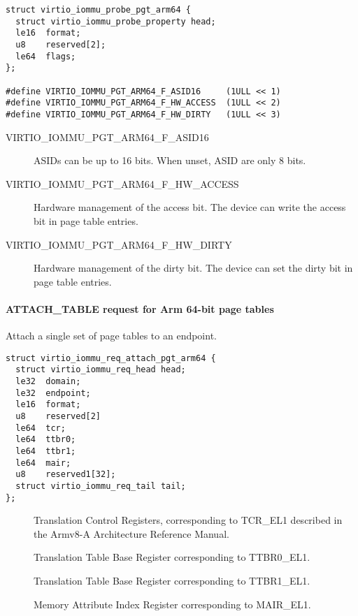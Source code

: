 \begin{lstlisting}
struct virtio_iommu_probe_pgt_arm64 {
  struct virtio_iommu_probe_property head;
  le16  format;
  u8    reserved[2];
  le64  flags;
};

#define VIRTIO_IOMMU_PGT_ARM64_F_ASID16     (1ULL << 1)
#define VIRTIO_IOMMU_PGT_ARM64_F_HW_ACCESS  (1ULL << 2)
#define VIRTIO_IOMMU_PGT_ARM64_F_HW_DIRTY   (1ULL << 3)
\end{lstlisting}

\begin{description}
  \item[VIRTIO_IOMMU_PGT_ARM64_F_ASID16] ASIDs can be up to 16
    bits. When unset, ASID are only 8 bits.
  \item[VIRTIO_IOMMU_PGT_ARM64_F_HW_ACCESS] Hardware management
    of the access bit. The device can write the access bit in page
    table entries.
  \item[VIRTIO_IOMMU_PGT_ARM64_F_HW_DIRTY] Hardware management of
    the dirty bit. The device can set the dirty bit in page table
    entries.
\end{description}

\paragraph{ATTACH_TABLE request for Arm 64-bit page tables}\label{sec:Device Types / IOMMU Device / Table Formats / Arm64 / ATTACH_TABLE}

Attach a single set of page tables to an endpoint.

\begin{lstlisting}
struct virtio_iommu_req_attach_pgt_arm64 {
  struct virtio_iommu_req_head head;
  le32  domain;
  le32  endpoint;
  le16  format;
  u8    reserved[2]
  le64  tcr;
  le64  ttbr0;
  le64  ttbr1;
  le64  mair;
  u8    reserved1[32];
  struct virtio_iommu_req_tail tail;
};
\end{lstlisting}

\begin{description}
  \item[] Translation Control Registers, corresponding
    to TCR_EL1 described in the Armv8-A Architecture Reference
    Manual.
  \item[] Translation Table Base Register
    corresponding to TTBR0_EL1.
  \item[] Translation Table Base Register
    corresponding to TTBR1_EL1.
  \item[] Memory Attribute Index Register
    corresponding to MAIR_EL1.
\end{description}

